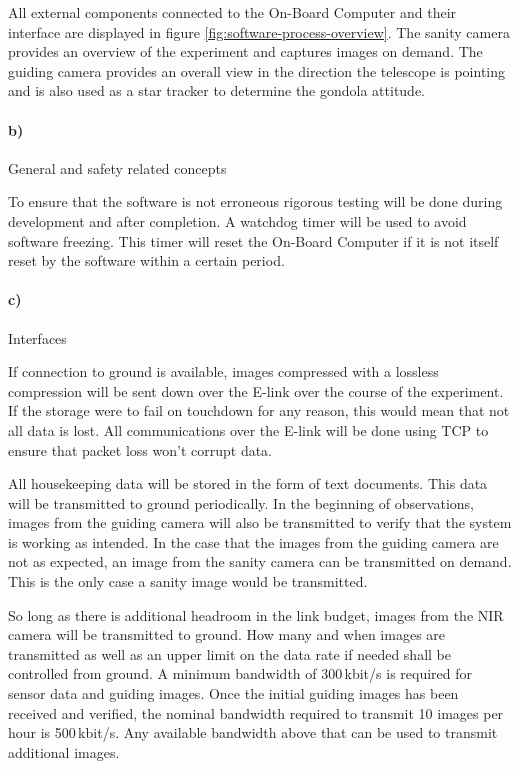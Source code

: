 All external components connected to the On-Board Computer and their interface are displayed in figure \ref{fig:software-process-overview}. The sanity camera provides an overview of the experiment and captures images on demand. The guiding camera provides an overall view in the direction the telescope is pointing and is also used as a star tracker to determine the gondola attitude.

\paragraph{b)} General and safety related concepts

To ensure that the software is not erroneous rigorous testing will be done during development and after completion. A watchdog timer will be used to avoid software freezing. This timer will reset the On-Board Computer if it is not itself reset by the software within a certain period.

\paragraph{c)} Interfaces

If connection to ground is available, images compressed with a lossless compression will be sent down over the E-link over the course of the experiment. If the storage were to fail on touchdown for any reason, this would mean that not all data is lost. All communications over the E-link will be done using TCP to ensure that packet loss won't corrupt data.



All housekeeping data will be stored in the form of text documents. This data will be transmitted to ground periodically. In the beginning of observations, images from the guiding camera will also be transmitted to verify that the system is working as intended. In the case that the images from the guiding camera are not as expected, an image from the sanity camera can be transmitted on demand. This is the only case a sanity image would be transmitted.

So long as there is additional headroom in the link budget, images from the NIR camera will be transmitted to ground. How many and when images are transmitted as well as an upper limit on the data rate if needed shall be controlled from ground. A minimum bandwidth of 300\,kbit/s is required for sensor data and guiding images. Once the initial guiding images has been received and verified, the nominal bandwidth required to transmit 10 images per hour is 500\,kbit/s. Any available bandwidth above that can be used to transmit additional images.

